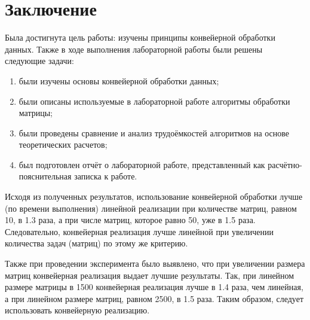 \chapter*{Заключение}

Была достигнута цель работы: изучены принципы конвейерной обработки данных.
Также в ходе выполнения лабораторной работы были решены следующие задачи:

\begin{enumerate}[label=\arabic*)]
	\item были изучены основы конвейерной обработки данных;
	\item были описаны используемые в лабораторной работе алгоритмы обработки матрицы;
    \item были проведены сравнение и анализ трудоёмкостей алгоритмов на основе теоретических расчетов;
	\item был подготовлен отчёт о лабораторной работе, представленный как расчётно-пояснительная записка к работе.
\end{enumerate}


Исходя из полученных результатов,  	использование конвейерной обработки лучше (по времени выполнения) линейной реализации при количестве матриц, равном 10, в 1.3 раза, а при числе матриц, которое равно 50, уже в 1.5 раза. Следовательно, конвейерная реализация лучше линейной при увеличении количества задач (матриц) по этому же критерию.

Также при проведении эксперимента было выявлено, что при увеличении размера матриц конвейерная реализация выдает лучшие результаты. Так, при линейном размере матрицы в 1500 конвейерная реализация лучше в 1.4 раза, чем линейная, а при линейном размере матриц, равном 2500, в 1.5 раза. Таким образом, следует использовать конвейерную реализацию.